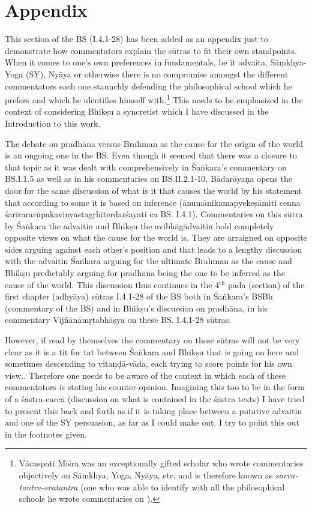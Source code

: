 \chapter*{Appendix}\label{appendix}
\setcounter{footnote}{0}

This section of the BS (I.4.1-28) has been added as an appendix just to demonstrate how commentators explain the sūtras to fit their own standpoints. When it comes to one’s own preferences in fundamentals, be it advaita, Sāṃkhya- Yoga (SY), Nyāya or otherwise there is no compromise amongst the different commentators each one staunchly defending the philosophical school which he prefers and which he identifies himself with.\footnote{Vācaspati Miśra was an exceptionally gifted scholar who wrote commentaries objectively on Sāmkhya, Yoga, Nyāya,  etc, and is therefore known as \textit{sarva-tantra-svatantra} (one  who was able to identify with all  the philosophical schools he wrote commentaries on ). } This needs to be emphasized in the context of considering Bhikṣu a syncretist which I have discussed in the Introduction to this work. 

The debate on pradhāna versus Brahman as the cause for the origin of the world is an ongoing one in the BS. Even though it seemed that there was a closure to that topic as it was dealt with comprehensively in  Śaṅkara’s commentary on BS.I.1.5 as well as in his commentaries on BS.II.2.1-10,  Bādarāyaṇa opens the door for the same discussion of what is it that causes the world  by his statement that according to some it is based on inference (ānumānikamapyekeṣāmiti cenna śarīrararūpakavinyastagṛhīterdarśayati ca BS. I.4.1). Commentaries on this sūtra by Śaṅkara the advaitin and Bhikṣu the avibhāgādvaitin hold completely opposite views on what the cause for the world is. They are arraigned on opposite sides arguing against each other’s position and that  leads to a lengthy discussion with the advaitin Śaṅkara arguing for the ultimate Brahman as the cause and Bhikṣu predictably arguing for pradhāna being the one to be inferred as the cause of the world. This discussion thus continues in the 4$^{\text{th}}$ pāda (section) of the first chapter (adhyāya) sūtras I.4.1-28 of the BS both in Śaṅkara’s BSBh (commentary of the BS) and in Bhikṣu’s discussion on pradhāna, in his commentary Vijñānāmṛtabhāṣya on these BS. I.4.1-28 sūtras. 

However, if read by themselves the commentary on these sūtras will not be very clear as it is a tit for tat between Śaṅkara and Bhikṣu that is going on here and sometimes descending to vitaṇḍā-vāda, each trying to score points for his own view.. Therefore one needs to be aware of the context in which each of these commentators is stating his counter-opinion. Imagining this too to be in the form of a śāstra-carcā (discussion on what is contained in the śāstra texts) I have tried to present this back and forth as if it is taking place between a  putative advaitin and one of the SY persuasion, as far as I could make out. I try to point this out in the footnotes given.


